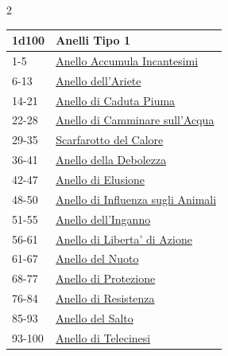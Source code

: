 \begin{multicols}{2}
{{\small\begin{tabularx}{\linewidth}{ll}
		\toprule
\rowcolor{gray!20}\textbf{1d100} & \textbf{Anelli Tipo 1}\\
\toprule
1-5 & \hyperlink{Anello Accumula Incantesimi}{Anello Accumula Incantesimi}\\
\rowcolor{gray!20}6-13& \hyperlink{Anello dell'Ariete}{Anello dell'Ariete}\\
14-21 & \hyperlink{Anello di Caduta Piuma}{Anello di Caduta Piuma}\\
\rowcolor{gray!20}22-28 & \hyperlink{Anello di Camminare sull'Acqua}{Anello di Camminare sull'Acqua}\\
29-35 & \hyperlink{Scarfarotto del Calore}{Scarfarotto del Calore}\\
\rowcolor{gray!20}36-41 & \hyperlink{Anello della Debolezza}{Anello della Debolezza}\\
42-47 & \hyperlink{Anello di Elusione}{Anello di Elusione}\\
\rowcolor{gray!20}48-50 & \hyperlink{Anello di Influenza sugli Animali}{Anello di Influenza sugli Animali}\\
51-55 & \hyperlink{Anello dell'Inganno}{Anello dell'Inganno}\\
\rowcolor{gray!20}56-61 & \hyperlink{Anello di Liberta' di Azione}{Anello di Liberta' di Azione}\\
61-67 & \hyperlink{Anello del Nuoto}{Anello del Nuoto}\\
\rowcolor{gray!20}68-77 & \hyperlink{Anello di Protezione}{Anello di Protezione}\\
76-84 & \hyperlink{Anello di Resistenza}{Anello di Resistenza}\\
\rowcolor{gray!20}85-93 & \hyperlink{Anello del Salto}{Anello del Salto}\\
93-100 & \hyperlink{Anello di Telecinesi}{Anello di Telecinesi}
\end{tabularx}}

\medskip\hypertarget{Anello Tipo 2}{}

}
\end{multicols}
